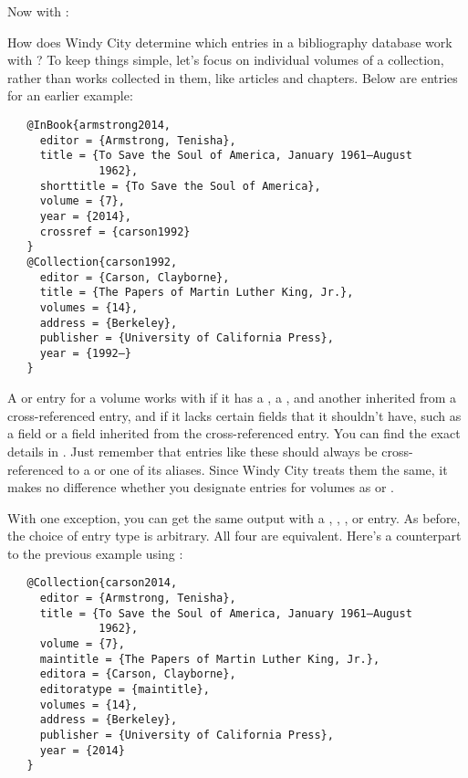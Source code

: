 \documentclass[11pt,letterpaper,oneside]{article}
\begin{document}
\noindent Now with :

\begin{citebib}
\item \cite[56]{doe2018}
\item \cite[128]{edwards2018}
\nocite{jones2018}
\end{citebib}

How does Windy City determine which entries in a bibliography database
work with ? To keep things simple, let's focus on
individual volumes of a collection, rather than works collected in
them, like articles and chapters. Below are entries for an earlier
example:

\begin{verbatim}
   @InBook{armstrong2014,
     editor = {Armstrong, Tenisha},
     title = {To Save the Soul of America, January 1961–August
              1962},
     shorttitle = {To Save the Soul of America},
     volume = {7},
     year = {2014},
     crossref = {carson1992}
   }
   @Collection{carson1992,
     editor = {Carson, Clayborne},
     title = {The Papers of Martin Luther King, Jr.},
     volumes = {14},
     address = {Berkeley},
     publisher = {University of California Press},
     year = {1992–}
   }
\end{verbatim}

A  or  entry for a volume works
with  if it has a , a ,
and another  inherited from a cross-referenced entry,
and if it lacks certain fields that it shouldn't have, such as a
 field or a  field inherited from
the cross-referenced entry. You can find the exact details in
. Just remember that entries like these should
always be cross-referenced to a  or one of its
aliases. Since Windy City treats them the same, it makes no difference
whether you designate entries for volumes as  or
.

With one exception, you can get the same output with a ,
, , or 
entry. As before, the choice of entry type is arbitrary. All four are
equivalent. Here's a counterpart to the previous example using
:

\begin{verbatim}
   @Collection{carson2014,
     editor = {Armstrong, Tenisha},
     title = {To Save the Soul of America, January 1961–August
              1962},
     volume = {7},
     maintitle = {The Papers of Martin Luther King, Jr.},
     editora = {Carson, Clayborne},
     editoratype = {maintitle},
     volumes = {14},
     address = {Berkeley},
     publisher = {University of California Press},
     year = {2014}
   }
\end{verbatim}
\end{document}

